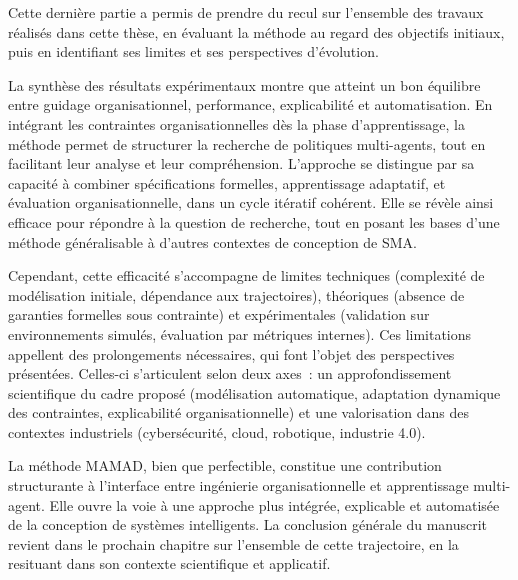 \noindent
Cette dernière partie a permis de prendre du recul sur l’ensemble des travaux réalisés dans cette thèse, en évaluant la méthode  au regard des objectifs initiaux, puis en identifiant ses limites et ses perspectives d’évolution.

\vspace{1em}

\noindent
La synthèse des résultats expérimentaux montre que  atteint un bon équilibre entre guidage organisationnel, performance, explicabilité et automatisation. En intégrant les contraintes organisationnelles dès la phase d’apprentissage, la méthode permet de structurer la recherche de politiques multi-agents, tout en facilitant leur analyse et leur compréhension. L’approche se distingue par sa capacité à combiner spécifications formelles, apprentissage adaptatif, et évaluation organisationnelle, dans un cycle itératif cohérent. Elle se révèle ainsi efficace pour répondre à la question de recherche, tout en posant les bases d’une méthode généralisable à d'autres contextes de conception de SMA.

\vspace{1em}

\noindent
Cependant, cette efficacité s’accompagne de limites techniques (complexité de modélisation initiale, dépendance aux trajectoires), théoriques (absence de garanties formelles sous contrainte) et expérimentales (validation sur environnements simulés, évaluation par métriques internes). Ces limitations appellent des prolongements nécessaires, qui font l’objet des perspectives présentées. Celles-ci s’articulent selon deux axes~: un approfondissement scientifique du cadre proposé (modélisation automatique, adaptation dynamique des contraintes, explicabilité organisationnelle) et une valorisation dans des contextes industriels (cybersécurité, cloud, robotique, industrie 4.0).

\vspace{1em}

\noindent
La méthode MAMAD, bien que perfectible, constitue une contribution structurante à l’interface entre ingénierie organisationnelle et apprentissage multi-agent. Elle ouvre la voie à une approche plus intégrée, explicable et automatisée de la conception de systèmes intelligents. La conclusion générale du manuscrit revient dans le prochain chapitre sur l’ensemble de cette trajectoire, en la resituant dans son contexte scientifique et applicatif.
